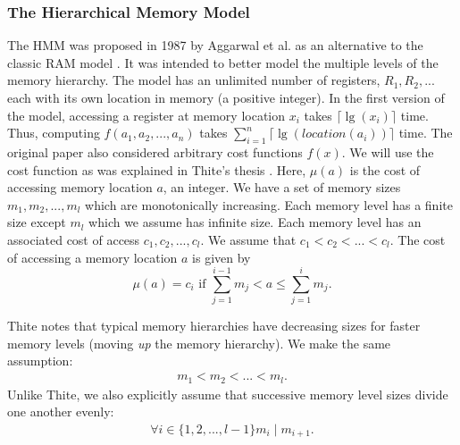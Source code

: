 \documentclass[]{beamer}
\theoremstyle{plain}
\begin{document}
 
\begin{frame} \frametitle{The Hierarchical Memory Model}\label{The Hierarchical Memory Model}

The HMM was proposed in 1987 by Aggarwal et al. as an alternative to the classic RAM model \cite{aggarwal1987model}. It was intended to better model the multiple levels of the memory hierarchy. The model has an unlimited number of registers, $R_1, R_2, ...$ each with its own location in memory (a positive integer). In the first version of the model, accessing a register at memory location $x_i$ takes $\lceil \lg(x_i) \rceil$ time. Thus, computing $f(a_1, a_2, ..., a_n)$ takes $\sum_{i=1}^{n} \lceil \lg(location(a_i)) \rceil$ time. The original paper also considered arbitrary cost functions $f(x)$. We will use the cost function as was explained in Thite's thesis \cite{thite2008optimum}. Here, $\mu (a)$ is the cost of accessing memory location $a$, an integer. We have a set of memory sizes $m_1, m_2, ..., m_l$ which are monotonically increasing. Each memory level has a finite size except $m_l$ which we assume has infinite size. Each memory level has an associated cost of access $c_1, c_2, ..., c_l$. We assume that $c_1 < c_2 < ... < c_l$. The cost of accessing a memory location $a$ is given by
\begin{equation}
\mu (a) = c_i \text{ if } \sum_{j = 1}^{i-1}m_j  < a \leq \sum_{j = 1}^{i}m_j.
\end{equation}


\noindent Thite notes that typical memory hierarchies have decreasing sizes for faster memory levels (moving \textit{up} the memory hierarchy). We make the same assumption:
\begin{align*}
m_1 < m_2 < ... < m_l.
\end{align*}
Unlike Thite, we also explicitly assume that successive memory level sizes divide one another evenly:
\begin{align*}
\forall i \in  \{1,2,...,l-1\} m_i \mid m_{i+1}.
\end{align*}
\end{frame}
\end{document}
